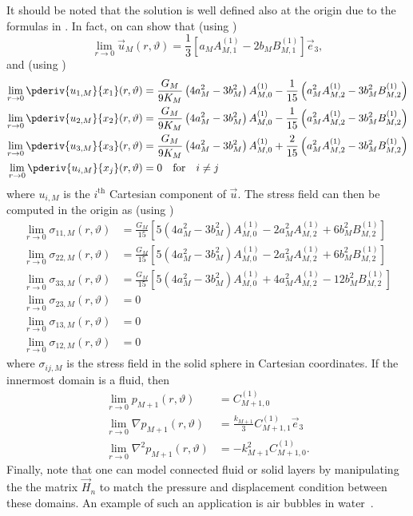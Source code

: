 It should be noted that the solution is well defined also at the origin due to the formulas in . In fact, on can show that (using )
\begin{equation*}
	\lim_{r\to 0}\vec{u}_M(r,\vartheta) = \frac13 \left[a_MA_{M,1}^{(1)}-2b_MB_{M,1}^{(1)}\right]\vec{e}_3,
\end{equation*}
and (using )
\begin{align*}
	\lim_{r\to 0}\pderiv{u_{1,M}}{x_1}(r,\vartheta) &= \frac{G_M}{9K_M}\left(4a_M^2-3b_M^2\right)A_{M,0}^{(1)} - \frac{1}{15}\left(a_M^2 A_{M,2}^{(1)} - 3b_M^2B_{M,2}^{(1)}\right)\\
	\lim_{r\to 0}\pderiv{u_{2,M}}{x_2}(r,\vartheta) &= \frac{G_M}{9K_M}\left(4a_M^2-3b_M^2\right)A_{M,0}^{(1)} - \frac{1}{15}\left(a_M^2 A_{M,2}^{(1)} - 3b_M^2B_{M,2}^{(1)}\right)\\
	\lim_{r\to 0}\pderiv{u_{3,M}}{x_3}(r,\vartheta) &= \frac{G_M}{9K_M}\left(4a_M^2-3b_M^2\right)A_{M,0}^{(1)} + \frac{2}{15}\left(a_M^2 A_{M,2}^{(1)} - 3b_M^2B_{M,2}^{(1)}\right)\\
	\lim_{r\to 0}\pderiv{u_{i,M}}{x_j}(r,\vartheta) &= 0\quad\text{for}\quad i\neq j
\end{align*}
where $u_{i,M}$ is the $i^{\mathrm{th}}$ Cartesian component of $\vec{u}$. The stress field can then be computed in the origin as (using )
\begin{align*}
	\lim_{r\to 0}\sigma_{11,M}(r,\vartheta) &= \frac{G_M}{15}\left[5\left(4a_M^2-3b_M^2\right)A_{M,0}^{(1)} - 2a_M^2A_{M,2}^{(1)} +6b_M^2B_{M,2}^{(1)}\right]\\
	\lim_{r\to 0}\sigma_{22,M}(r,\vartheta) &= \frac{G_M}{15}\left[5\left(4a_M^2-3b_M^2\right)A_{M,0}^{(1)} - 2a_M^2A_{M,2}^{(1)} +6b_M^2B_{M,2}^{(1)}\right]\\
	\lim_{r\to 0}\sigma_{33,M}(r,\vartheta) &= \frac{G_M}{15}\left[5\left(4a_M^2-3b_M^2\right)A_{M,0}^{(1)} + 4a_M^2A_{M,2}^{(1)} -12b_M^2B_{M,2}^{(1)}\right]\\
	\lim_{r\to 0}\sigma_{23,M}(r,\vartheta) &= 0\\
	\lim_{r\to 0}\sigma_{13,M}(r,\vartheta) &= 0\\
	\lim_{r\to 0}\sigma_{12,M}(r,\vartheta) &= 0
\end{align*}
where $\sigma_{ij,M}$ is the stress field in the solid sphere in Cartesian coordinates. If the innermost domain is a fluid, then
\begin{align*}
	\lim_{r\to 0}p_{M+1}(r,\vartheta) &= C_{M+1,0}^{(1)}\\
	\lim_{r\to 0}\nabla p_{M+1}(r,\vartheta) &= \frac{k_{M+1}}{3}C_{M+1,1}^{(1)} \vec{e}_3\\
	\lim_{r\to 0}\nabla^2 p_{M+1}(r,\vartheta) &= -k_{M+1}^2 C_{M+1,0}^{(1)}.
\end{align*}
Finally, note that one can model connected fluid or solid layers by manipulating the the matrix $\vec{H}_n$ to match the pressure and displacement condition between these domains. An example of such an application is air bubbles in water~\cite{Fender1972sfa}.

